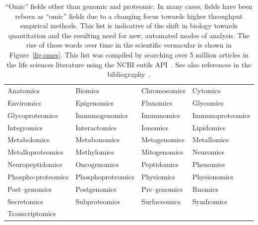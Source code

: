 \begin{table}
    \caption[``Omic'' fields other than genomic and proteomic]{
        ``Omic'' fields other than genomic and proteomic.
        In many cases, fields have been reborn as ``omic''
        fields due to a changing focus towards higher throughput
        empirical methods.  This list is indicative of the shift
        in biology towards quantitation and the resulting need
        for new, automated modes of analysis.  The rise
        of these words over time in the scientific vernacular
        is shown in Figure~\vref{fig:omes}.
        This list
        was compiled by searching over 5 million articles in the
        life sciences literature using the NCBI eutils
        API~\cite{ncbi2005eutils}.
        See also references in the
    bibliography~\cite{gerstein2005omes,dana2005omics}.
        }\label{table:omes}
	\centering
    \begin{tabular}{llll} \hline \hline
    Anatomics
    & Biomics
    & Chromosomics
    & Cytomics \\
     Enviromics
    & Epigenomics
    & Fluxomics
    & Glycomics \\
     Glycoproteomics
    & Immunogenomics
    & Immunomics
    & Immunoproteomics \\
     Integromics
    & Interactomics
    & Ionomics
    & Lipidomics \\
     Metabolomics
    & Metabonomics
    & Metagenomics
    & Metallomics  \\
     Metalloproteomics
    & Methylomics
    & Mitogenomics
    & Neuromics \\
     Neuropeptidomics
    & Oncogenomics
    & Peptidomics
    & Phenomics  \\
     Phospho-proteomics
    & Phosphoproteomics
    & Physiomics
    & Physionomics  \\
     Post--genomics
    & Postgenomics
    & Pre--genomics
    & Rnomics \\
     Secretomics
    & Subproteomics
    & Surfaceomics
    & Syndromics \\
     Transcriptomics \\ \hline \hline
    \end{tabular}
\end{table}



